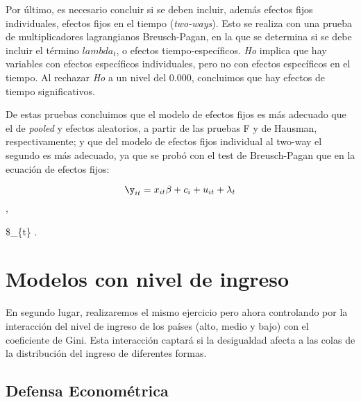 \documentclass[
  11pt,
]{article}
\begin{document}
Por último, es necesario concluir si se deben incluir, además efectos
fijos individuales, efectos fijos en el tiempo (\emph{two-ways}). Esto
se realiza con una prueba de multiplicadores lagrangianos Breusch-Pagan,
en la que se determina si se debe incluir el término \(lambda_{t}\), o
efectos tiempo-específicos. \emph{Ho} implica que hay variables con
efectos específicos individuales, pero no con efectos específicos en el
tiempo. Al rechazar \emph{Ho} a un nivel del 0.000, concluimos que hay
efectos de tiempo significativos.

De estas pruebas concluimos que el modelo de efectos fijos es más
adecuado que el de \emph{pooled} y efectos aleatorios, a partir de las
pruebas F y de Hausman, respectivamente; y que del modelo de efectos
fijos individual al two-way el segundo es más adecuado, ya que se probó
con el test de Breusch-Pagan que en la ecuación de efectos fijos:

\[\y_{it}=x_{it}\beta+c_i+u_{it} +\lambda_{t}\],

\$\lambda\_\{t\} .

\hypertarget{modelos-con-nivel-de-ingreso}{%
\section{Modelos con nivel de
ingreso}\label{modelos-con-nivel-de-ingreso}}

En segundo lugar, realizaremos el mismo ejercicio pero ahora controlando
por la interacción del nivel de ingreso de los países (alto, medio y
bajo) con el coeficiente de Gini. Esta interacción captará si la
desigualdad afecta a las colas de la distribución del ingreso de
diferentes formas.

\hypertarget{defensa-economuxe9trica}{%
\subsection{Defensa Econométrica}\label{defensa-economuxe9trica}}
\end{document}
